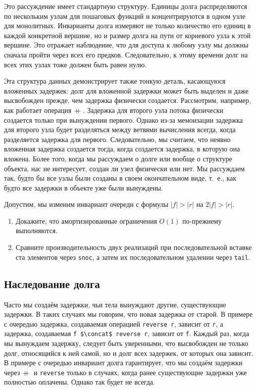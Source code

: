 Это рассуждение имеет стандартную структуру. Единицы долга
распределяются по нескольким узлам для пошаговых функций и
концентрируются в одном узле для монолитных. Инварианты долга
измеряют не только количество его единиц в каждой конкретной вершине,
но и размер долга на пути от корневого узла к этой вершине. Это
отражает наблюдение, что для доступа к любому узлу мы должны сначала
пройти через всех его предков. Следовательно, к этому времени долг на
всех этих узлах тоже должен быть равен нулю.

Эта структура данных демонстрирует также тонкую деталь, касающуюся
вложенных задержек: долг для вложенной задержки может быть выделен и
даже высвобожден прежде, чем задержка физически создается. Рассмотрим,
например, как работает операция $+\!\!\!+\,$. Задержка для второго узла
потока физически создается только при вынуждении первого. Однако из-за
мемоизации задержка для второго узла будет разделяться между ветвями
вычисления всегда, когда разделяется задержка для
первого. Следовательно, мы считаем, что неявно вложенная задержка
создается тогда, когда создается задержка, в которую она вложена.
Более того, когда мы рассуждаем о долге или вообще о структуре
объекта, нас не интересует, создан ли узел физически или нет. Мы
рассуждаем так, будто бы все узлы были созданы в своем
окончательном виде, т.~е., как будто все задержки в объекте уже были
вынуждены.

\begin{exercise}\label{ex:6.2}
  Допустим, мы изменим инвариант очереди с формулы $|f| > |r|$ на $2|f| >
  |r|$.
  \begin{enumerate}
  \item Докажите, что амортизированные ограничения $O(1)$ по-прежнему
    выполняются.
  \item Сравните производительность двух реализаций при
    последовательной вставке ста элементов через \lstinline!snoc!, а
    затем их последовательном удалении через \lstinline!tail!.
  \end{enumerate}
\end{exercise}

\subsection{Наследование долга}
\label{sc:6.3.3}

Часто мы создаём задержки, чьи тела вынуждают другие, существующие
задержки. В таких случаях мы говорим, что новая задержка
 от старой. В примере с очередью задержка,
создаваемая операцией \lstinline!reverse r!, зависит от \lstinline!r!,
а задержка, создаваемая \lstinline!f $\concat$ reverse r!, зависит от
\lstinline!f!.  Каждый раз, когда мы вынуждаем задержку, следует быть
уверенными, что высвобожден не только долг, относящийся к ней самой,
но и долг всех задержек, от которых она зависит. В примере с очередью
инвариант долга гарантирует, что мы создаём задержки через $+\!\!\!+\,$ и
\lstinline!reverse! только в случаях, когда ранее существующие
задержки уже полностью оплачены. Однако так будет не всегда.


